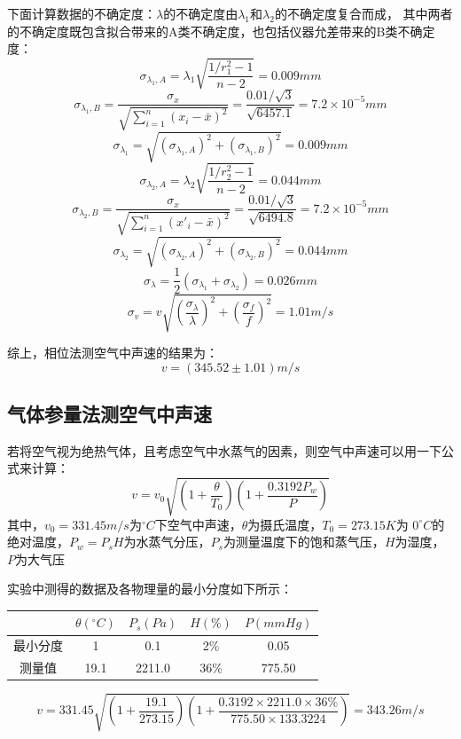 \documentclass{article}
\newcommand{\degreesCelsius}{^\circ C}
\begin{document}
    下面计算数据的不确定度：$\lambda$的不确定度由$\lambda_1$和$\lambda_2$的不确定度复合而成，
    其中两者的不确定度既包含拟合带来的A类不确定度，也包括仪器允差带来的B类不确定度：
    $$\sigma_{\lambda_1,A}=\lambda_1 \sqrt{\frac{1/r_1^2-1}{n-2}}=0.009mm$$
    $$\sigma_{\lambda_1,B}=\frac{\sigma_x}{\sqrt{\sum_{i=1}^n (x_i-\bar{x})^2}}=\frac{0.01/\sqrt{3}}{\sqrt{6457.1}}=7.2\times 10^{-5}mm$$
    $$\sigma_{\lambda_1}=\sqrt{(\sigma_{\lambda_1,A})^2+(\sigma_{\lambda_1,B})^2}=0.009mm$$
    $$\sigma_{\lambda_2,A}=\lambda_2 \sqrt{\frac{1/r_2^2-1}{n-2}}=0.044mm$$
    $$\sigma_{\lambda_2,B}=\frac{\sigma_x}{\sqrt{\sum_{i=1}^n (x'_i-\bar{x})^2}}=\frac{0.01/\sqrt{3}}{\sqrt{6494.8}}=7.2\times 10^{-5}mm$$
    $$\sigma_{\lambda_2}=\sqrt{(\sigma_{\lambda_2,A})^2+(\sigma_{\lambda_2,B})^2}=0.044mm$$
    $$\sigma_{\lambda}=\frac{1}{2}(\sigma_{\lambda_1}+\sigma_{\lambda_2})=0.026mm$$
    $$\sigma_v=v\sqrt{(\frac{\sigma_\lambda}{\lambda})^2+(\frac{\sigma_f}{f})^2}=1.01m/s$$

    综上，相位法测空气中声速的结果为：
    $$v=(345.52\pm1.01)m/s$$

    \subsection{气体参量法测空气中声速}
    若将空气视为绝热气体，且考虑空气中水蒸气的因素，则空气中声速可以用一下公式来计算：
    $$v=v_0\sqrt{(1+\frac{\theta}{T_0})(1+\frac{0.3192P_w}{P})}$$
    其中，$v_0=331.45m/s$为$\degreesCelsius$下空气中声速，$\theta$为摄氏温度，$T_0=273.15K$为
    $0\degreesCelsius$的绝对温度，$P_w=P_s H$为水蒸气分压，$P_s$为测量温度下的饱和蒸气压，$H$为湿度，
    $P$为大气压

    实验中测得的数据及各物理量的最小分度如下所示：
    
    \begin{center}
        \begin{tabular}{|c|c|c|c|c|}
            \hline
            & $\theta(\degreesCelsius)$ & $P_s(Pa)$ & $H(\%)$ & $P(mmHg)$\\
            \hline
            最小分度  & 1     & 0.1   & 2\%   & 0.05 \\
            \hline
            测量值   & 19.1  & 2211.0  & 36\%  & 775.50 \\
            \hline
        \end{tabular}
    \end{center}

    $$v=331.45\sqrt{(1+\frac{19.1}{273.15})(1+\frac{0.3192\times2211.0\times36\%}{775.50\times 133.3224})}=343.26m/s$$
\end{document}
